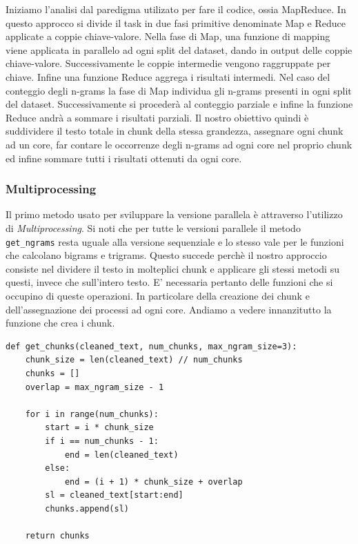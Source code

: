 \documentclass[10pt,twocolumn,letterpaper]{article}
\begin{document}
Iniziamo l'analisi dal paredigma utilizato per fare il codice, ossia MapReduce. In questo approcco si divide il task in due fasi primitive denominate Map e Reduce applicate a coppie chiave-valore. Nella fase di Map, una funzione di mapping viene applicata in parallelo ad ogni split del dataset, dando in output delle coppie chiave-valore. Successivamente le coppie intermedie vengono raggruppate per chiave. Infine una funzione Reduce aggrega i risultati intermedi.
Nel caso del conteggio degli n-grams la fase di Map individua gli n-grams presenti in ogni split del dataset. Successivamente si procederà al conteggio parziale e infine la funzione Reduce andrà a sommare i risultati parziali. Il nostro obiettivo quindi è suddividere il testo totale in chunk della stessa grandezza, assegnare ogni chunk ad un core, far contare le occorrenze degli n-grams ad ogni core nel proprio chunk ed infine sommare tutti i risultati ottenuti da ogni core.

\subsubsection{Multiprocessing}
Il primo metodo usato per sviluppare la versione parallela è attraverso l'utilizzo di \textit{Multiprocessing}. Si noti che per tutte le versioni parallele il metodo \lstinline{get_ngrams} resta uguale alla versione sequenziale e lo stesso vale per le funzioni che calcolano bigrams e trigrams. Questo succede perchè il nostro approccio consiste nel dividere il testo in molteplici chunk e applicare gli stessi metodi su questi, invece che sull'intero testo.
E' necessaria pertanto delle funzioni che si occupino di queste operazioni. In particolare della creazione dei chunk e dell'assegnazione dei processi ad ogni core.
Andiamo a vedere innanzitutto la funzione che crea i chunk.

\begin{lstlisting}[caption={Creazione di chunk di testo.}]
def get_chunks(cleaned_text, num_chunks, max_ngram_size=3):
    chunk_size = len(cleaned_text) // num_chunks
    chunks = []
    overlap = max_ngram_size - 1

    for i in range(num_chunks):
        start = i * chunk_size
        if i == num_chunks - 1:
            end = len(cleaned_text)
        else:
            end = (i + 1) * chunk_size + overlap
        sl = cleaned_text[start:end]
        chunks.append(sl)
        
    return chunks
\end{lstlisting}
\end{document}
